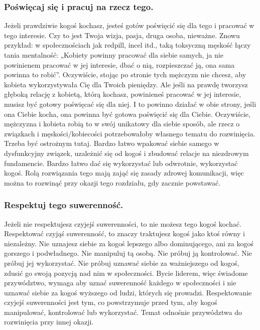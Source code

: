 \documentclass[../dotknieci-miloscia.tex]{subfiles}
\begin{document}
\subsubsection{Poświęcaj się i pracuj na rzecz tego.}
Jeżeli prawdziwie kogoś kochasz, jesteś gotów poświęcić się dla tego i pracować w tego interesie. 
Czy to jest Twoja wizja, pasja, druga osoba, nieważne. 
Znowu przykład: w społecznościach jak redpill, incel itd., 
taką toksyczną męskość łączy tania mentalność: 
„Kobiety powinny pracować dla siebie samych, ja nie powinienem pracować w jej interesie, 
dbać o nią, rozpieszczać ją, ona sama powinna to robić”. 
Oczywiście, stojąc po stronie tych mężczyzn nie chcesz, 
aby kobieta wykorzystywała Cię dla Twoich pieniędzy. 
Ale jeśli na prawdę tworzysz głęboką relację z kobietą, którą kochasz, 
powinieneś pracować w jej interesie, musisz być gotowy poświęcać się dla niej. 
I to powinno działać w obie strony, 
jeśli ona Ciebie kocha, ona powinna być gotowa poświęcić się dla Ciebie. 
Oczywiście, mężczyzna i kobieta robią to w swój unikatowy dla siebie sposób, 
ale rzecz o związkach i męskości/kobiecości potrzebowałoby własnego tematu do rozwinięcia.
Trzeba być ostrożnym tutaj. 
Bardzo łatwo wpakować siebie samego w dysfunkcyjny związek, 
uzależnić się od kogoś i zbudować relacje na niezdrowym fundamencie. 
Bardzo łatwo dać się wykorzystać lub odwrotnie, wykorzystać kogoś. 
Rolą rozwiązania tego mają zająć się zasady zdrowej komunikacji, 
więc można to rozwinąć przy okazji tego rozdziału, gdy zacznie powstawać.

\subsubsection{Respektuj tego suwerenność.}
Jeżeli nie respektujesz czyjejś suwerenności, to nie możesz tego kogoś kochać. 
Respektować czyjąś suwerenność, to znaczy traktujesz kogoś jako ktoś równy i niezależny. 
Nie uznajesz siebie za kogoś lepszego albo dominującego, 
ani za kogoś gorszego i podwładnego. 
Nie manipuluj tą osobą. 
Nie próbuj ją kontrolować. 
Nie próbuj jej wykorzystać. 
Nie próbuj uznawać siebie za ważniejszego od kogoś, 
zdusić go swoją pozycją nad nim w społeczności. 
Bycie liderem, więc świadome przywództwo, 
wymaga aby uznać suwerenność każdego w społeczności
i nie uznawać siebie za kogoś wyższego od ludzi, których się prowadzi. 
Respektowanie czyjejś suwerenności jest tym, co powstrzymuje przed tym, 
aby kogoś manipulować, kontrolować lub wykorzystać. 
Temat odnośnie przywództwa do rozwinięcia przy innej okazji.
\end{document}
